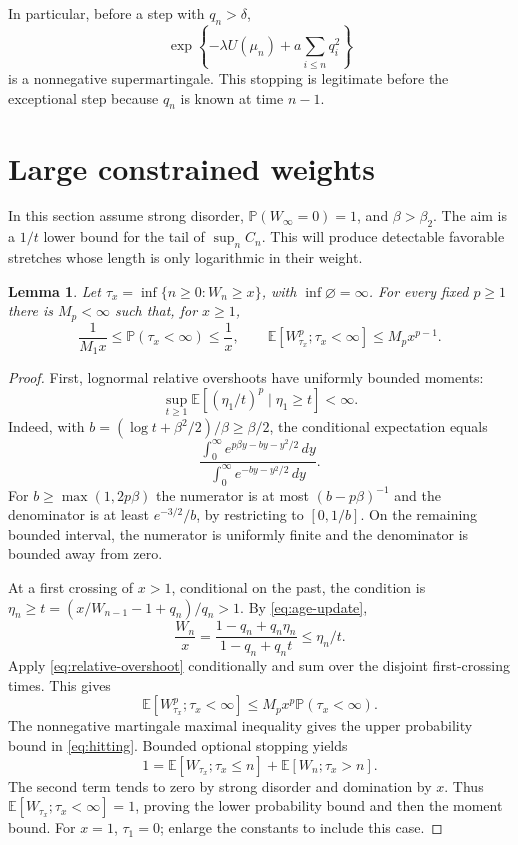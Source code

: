 \documentclass[11pt]{article}
\newtheorem{lemma}[lemma]{Lemma}
\theoremstyle{remark}
\numberwithin{equation}{section}
\newcommand{\E}{\mathbb E}
\newcommand{\Penv}{\mathbb P}
\begin{document}
In particular, before a step with $q_n>\delta$,
\begin{equation}\label{eq:potential-martingale}
 \exp\!\left\{-\lambda U(\mu_n)+a\sum_{i\le n}q_i^2\right\}
\end{equation}
is a nonnegative supermartingale. This stopping is legitimate before the
exceptional step because $q_n$ is known at time $n-1$.

\section{Large constrained weights}\label{sec:tail}

In this section assume strong disorder, $\Penv(W_\infty=0)=1$, and
$\beta>\beta_2$. The aim is a $1/t$ lower bound for the tail of
$\sup_n C_n$. This will produce detectable favorable stretches whose
length is only logarithmic in their weight.

\begin{lemma}\label{lem:overshoot}
Let $\tau_x=\inf\{n\ge0:W_n\ge x\}$, with $\inf\varnothing=\infty$.
For every fixed $p\ge1$ there is $M_p<\infty$ such that, for $x\ge1$,
\begin{equation}\label{eq:hitting}
 \frac1{M_1x}\le\Penv(\tau_x<\infty)\le\frac1x,\qquad
 \E[W_{\tau_x}^p;\tau_x<\infty]\le M_p x^{p-1}.
\end{equation}
\end{lemma}
\begin{proof}
First, lognormal relative overshoots have uniformly bounded moments:
\begin{equation}\label{eq:relative-overshoot}
 \sup_{t\ge1}\E[(\eta_1/t)^p\mid\eta_1\ge t]<\infty.
\end{equation}
Indeed, with $b=(\log t+\beta^2/2)/\beta\ge\beta/2$, the conditional
expectation equals
\[
 \frac{\int_0^\infty e^{p\beta y-by-y^2/2}\,dy}
      {\int_0^\infty e^{-by-y^2/2}\,dy}.
\]
For $b\ge\max(1,2p\beta)$ the numerator is at most $(b-p\beta)^{-1}$
and the denominator is at least $e^{-3/2}/b$, by restricting to $[0,1/b]$.
On the remaining bounded interval, the numerator is uniformly finite and
the denominator is bounded away from zero.

At a first crossing of $x>1$, conditional on the past, the condition is
$\eta_n\ge t=(x/W_{n-1}-1+q_n)/q_n>1$. By \eqref{eq:age-update},
\[
 \frac{W_n}{x}=\frac{1-q_n+q_n\eta_n}{1-q_n+q_nt}\le\eta_n/t.
\]
Apply \eqref{eq:relative-overshoot} conditionally and sum over the disjoint
first-crossing times. This gives
\[
 \E[W_{\tau_x}^p;\tau_x<\infty]\le M_p x^p\Penv(\tau_x<\infty).
\]
The nonnegative martingale maximal inequality gives the upper probability
bound in \eqref{eq:hitting}. Bounded optional stopping yields
\[
 1=\E[W_{\tau_x};\tau_x\le n]+\E[W_n;\tau_x>n].
\]
The second term tends to zero by strong disorder and domination by $x$.
Thus $\E[W_{\tau_x};\tau_x<\infty]=1$, proving the lower probability
bound and then the moment bound. For $x=1$, $\tau_1=0$; enlarge the constants
to include this case.
\end{proof}
\end{document}
